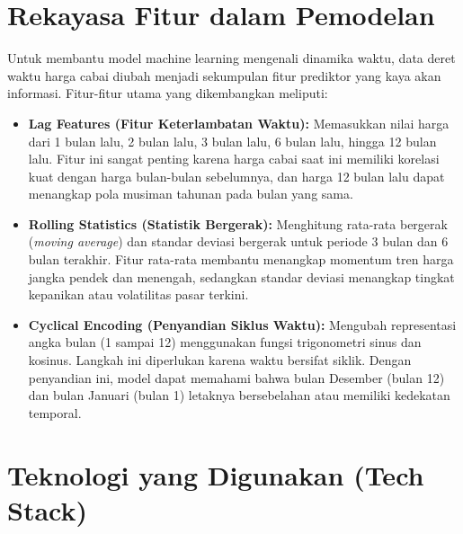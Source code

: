 \documentclass[12pt, a4paper]{article}
\begin{document}
\section{Rekayasa Fitur dalam Pemodelan}

Untuk membantu model machine learning mengenali dinamika waktu, data deret waktu harga cabai diubah menjadi sekumpulan fitur prediktor yang kaya akan informasi. Fitur-fitur utama yang dikembangkan meliputi:
\begin{itemize}
    \item \textbf{Lag Features (Fitur Keterlambatan Waktu):} Memasukkan nilai harga dari 1 bulan lalu, 2 bulan lalu, 3 bulan lalu, 6 bulan lalu, hingga 12 bulan lalu. Fitur ini sangat penting karena harga cabai saat ini memiliki korelasi kuat dengan harga bulan-bulan sebelumnya, dan harga 12 bulan lalu dapat menangkap pola musiman tahunan pada bulan yang sama.
    \item \textbf{Rolling Statistics (Statistik Bergerak):} Menghitung rata-rata bergerak (\textit{moving average}) dan standar deviasi bergerak untuk periode 3 bulan dan 6 bulan terakhir. Fitur rata-rata membantu menangkap momentum tren harga jangka pendek dan menengah, sedangkan standar deviasi menangkap tingkat kepanikan atau volatilitas pasar terkini.
    \item \textbf{Cyclical Encoding (Penyandian Siklus Waktu):} Mengubah representasi angka bulan (1 sampai 12) menggunakan fungsi trigonometri sinus dan kosinus. Langkah ini diperlukan karena waktu bersifat siklik. Dengan penyandian ini, model dapat memahami bahwa bulan Desember (bulan 12) dan bulan Januari (bulan 1) letaknya bersebelahan atau memiliki kedekatan temporal.
\end{itemize}

\section{Teknologi yang Digunakan (Tech Stack)}
\end{document}
